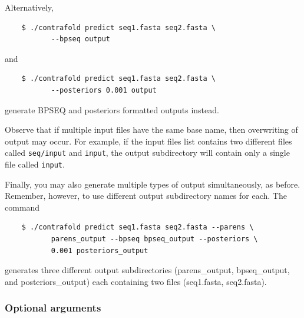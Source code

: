 \documentclass{article}
\begin{document}
  Alternatively, 
  \begin{verbatim}
    $ ./contrafold predict seq1.fasta seq2.fasta \
           --bpseq output\end{verbatim}
  and
  \begin{verbatim}
    $ ./contrafold predict seq1.fasta seq2.fasta \
           --posteriors 0.001 output\end{verbatim}
  generate BPSEQ and posteriors formatted outputs instead.

  Observe that if multiple input files have the same base name, then
  overwriting of output may occur.  For example, if the input files list
  contains two different files called \texttt{seq/input} and \texttt{input},
  the output subdirectory will contain only a single file called \texttt{input}.

  Finally, you may also generate multiple types of output simultaneously,
  as before.  Remember, however, to use different output subdirectory names
  for each.  The command
  \begin{verbatim}
    $ ./contrafold predict seq1.fasta seq2.fasta --parens \
           parens_output --bpseq bpseq_output --posteriors \
           0.001 posteriors_output\end{verbatim}
  generates three different output subdirectories (parens\_output,
  bpseq\_output, and posteriors\_output) each containing two files
  (seq1.fasta, seq2.fasta).

  \subsubsection{Optional arguments}
\end{document}
